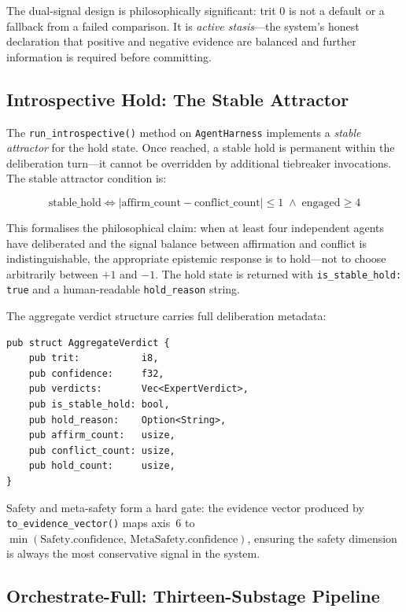 \documentclass[11pt,a4paper]{article}
\begin{document}
The dual-signal design is philosophically significant: trit $0$ is not a
default or a fallback from a failed comparison. It is \emph{active stasis}—the
system's honest declaration that positive and negative evidence are balanced
and further information is required before committing.

\subsection{Introspective Hold: The Stable Attractor}
\label{subsec:hold}

The \texttt{run\_introspective()} method on \texttt{AgentHarness} implements a
\emph{stable attractor} for the hold state. Once reached, a stable hold is
permanent within the deliberation turn—it cannot be overridden by additional
tiebreaker invocations. The stable attractor condition is:

\begin{equation}
  \text{stable\_hold} \iff
  \lvert \text{affirm\_count} - \text{conflict\_count} \rvert \leq 1
  \;\wedge\;
  \text{engaged} \geq 4
  \label{eq:stable_hold}
\end{equation}

This formalises the philosophical claim: when at least four independent
agents have deliberated and the signal balance between affirmation and
conflict is indistinguishable, the appropriate epistemic response is to
hold—not to choose arbitrarily between $+1$ and $-1$. The hold state
is returned with \texttt{is\_stable\_hold: true} and a human-readable
\texttt{hold\_reason} string.

The aggregate verdict structure carries full deliberation metadata:

\begin{lstlisting}[caption={AggregateVerdict fields}]
pub struct AggregateVerdict {
    pub trit:           i8,
    pub confidence:     f32,
    pub verdicts:       Vec<ExpertVerdict>,
    pub is_stable_hold: bool,
    pub hold_reason:    Option<String>,
    pub affirm_count:   usize,
    pub conflict_count: usize,
    pub hold_count:     usize,
}
\end{lstlisting}

Safety and meta-safety form a hard gate: the evidence vector produced by
\texttt{to\_evidence\_vector()} maps axis~6 to
$\min(\text{Safety.confidence},\, \text{MetaSafety.confidence})$, ensuring
the safety dimension is always the most conservative signal in the system.

\subsection{Orchestrate-Full: Thirteen-Substage Pipeline}
\label{subsec:orchestrate_full}
\end{document}
